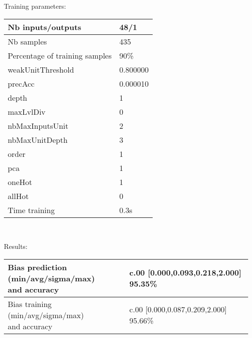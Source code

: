 Training parameters:\\
\begin{center}
\begin{tabular}{|l|l|}
\hline
Nb inputs/outputs&48/1\\
\hline
Nb samples&435\\
\hline
Percentage of training samples&90\%\\
\hline
weakUnitThreshold&0.800000\\
\hline
precAcc&0.000010\\
\hline
depth&1\\
\hline
maxLvlDiv&0\\
\hline
nbMaxInputsUnit&2\\
\hline
nbMaxUnitDepth&3\\
\hline
order&1\\
\hline
pca&1\\
\hline
oneHot&1\\
\hline
allHot&0\\
\hline
Time training&0.3s\\
\hline
\end{tabular}\\
\end{center}\newline
Results:
\begin{center}
\begin{tabular}{|l|l|}
\hline
\makecell{Bias prediction (min/avg/sigma/max)\\and accuracy}&\makecell{c.00 [0.000,0.093,0.218,2.000] 95.35\%\\
}\\

\hline
\makecell{Bias training (min/avg/sigma/max)\\and accuracy}&\makecell{c.00 [0.000,0.087,0.209,2.000] 95.66\%\\
}\\
\hline
\end{tabular}\
\end{center}
